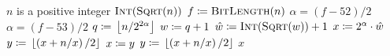 \begin{algorithm}[t]
\caption{Integer Square Root algorithm using floating-point sqrt}
\label{alg:isqrt_float_1}
\begin{algorithmic}[1]
\Require $n$ is a positive integer
        \State \Return $\textsc{Int}(\textsc{Sqrt}(n))$
    \EndIf
    \State $f \coloneqq{} \textsc{BitLength}(n)$
        \State $\alpha = (f - 52)/2$
    \Else
        \State $\alpha = (f - 53)/2$
    \EndIf
    \State $q \coloneqq{} \left\lfloor n/2^{2\alpha} \right\rfloor$
    \State $w \coloneqq{} q + 1$
    \State $\hat{w} \coloneqq{} \textsc{Int}(\textsc{Sqrt}(w)) + 1$
    \State $x \coloneqq{} 2^{\alpha}\cdot\hat{w}$
    \State $y \coloneqq{} \left\lfloor \left( x + n/x \right)/2 \right\rfloor$
        \State $x \coloneqq{} y$
        \State $y \coloneqq{} \left\lfloor \left( x + n/x \right)/2 \right\rfloor$
    \EndWhile
    \State \Return $x$
\EndProcedure
\end{algorithmic}
\end{algorithm}
